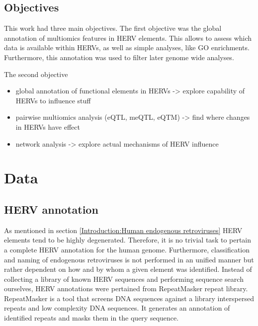 \documentclass[a4paper,12pt,twoside,openright]{article}
\let\oldsection\section
\def\section{\cleardoublepage\oldsection}
\begin{document}
\subsection{Objectives}
This work had three main objectives. The first objective was the global annotation of multiomics features in HERV elements. This allows to assess which data is available within HERVs, as well as simple analyses, like GO enrichments. Furthermore, this annotation was used to filter later genome wide analyses.

The second objective


\begin{itemize}
\item global annotation of functional elements in HERVs -> explore capability of HERVs to influence stuff
\item pairwise multiomics analysis (eQTL, meQTL, eQTM) -> find where changes in HERVs have effect
\item network analysis -> explore actual mechanisms of HERV influence
\end{itemize}

\newpage
\section{Data}
\label{Data}

\subsection{HERV annotation}
\label{Data:HERV annotation}
As mentioned in section \ref{Introduction:Human endogenous retroviruses} HERV elements tend to be highly degenerated. Therefore, it is no trivial task to pertain a complete HERV annotation for the human genome. Furthermore, classification and naming of endogenous retroviruses is not performed in an unified manner but rather dependent on how and by whom a given element was identified. 
Instead of collecting a library of known HERV sequences and performing sequence search ourselves, HERV annotations were pertained from RepeatMasker\cite{RepeatMasker} repeat library. RepeatMasker is a tool that screens DNA sequences against a library interspersed repeats and low complexity DNA sequences. It generates an annotation of identified repeats and masks them in the query sequence.
\end{document}
